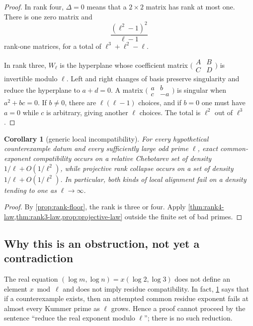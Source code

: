 \documentclass[11pt,oneside]{article}
\newtheorem{corollary}[theorem]{Corollary}
\theoremstyle{definition}
\theoremstyle{remark}
\newcommand{\C}{\mathbb{C}}
\begin{document}
\begin{proof}
In rank four, $\Delta=0$ means that a $2\times2$ matrix has rank at most one.
There is one zero matrix and
\[
 \frac{(\ell^2-1)^2}{\ell-1}
\]
rank-one matrices, for a total of $\ell^3+\ell^2-\ell$.

In rank three, $W_\ell$ is the hyperplane whose coefficient matrix
$\bigl(\begin{smallmatrix}A&B\\C&D\end{smallmatrix}\bigr)$ is invertible
modulo $\ell$.  Left and right changes of basis preserve singularity and
reduce the hyperplane to $a+d=0$.  A matrix
$\bigl(\begin{smallmatrix}a&b\\c&-a\end{smallmatrix}\bigr)$ is singular when
$a^2+bc=0$.  If $b\ne0$, there are $\ell(\ell-1)$ choices, and if $b=0$ one
must have $a=0$ while $c$ is arbitrary, giving another $\ell$ choices.  The
total is $\ell^2$ out of $\ell^3$.
\end{proof}

\begin{corollary}[generic local incompatibility]\label{cor:generic-incompatibility}
For every hypothetical counterexample datum and every sufficiently large odd
prime $\ell$, exact common-exponent compatibility occurs on a relative
Chebotarev set of density $1/\ell+O(1/\ell^2)$, while projective rank collapse
occurs on a set of density $1/\ell+O(1/\ell^2)$.  In particular, both kinds
of local alignment fail on a density tending to one as $\ell\to\infty$.
\end{corollary}

\begin{proof}
By \cref{prop:rank-floor}, the rank is three or four.  Apply
\cref{thm:rank4-law,thm:rank3-law,prop:projective-law} outside the finite set
of bad primes.
\end{proof}

\subsection{Why this is an obstruction, not yet a contradiction}

The real equation $(\log m,\log n)=x(\log2,\log3)$ does not define an element
$x\bmod\ell$ and does not imply residue compatibility.  In fact,
\cref{cor:generic-incompatibility} says that if a counterexample exists, then
an attempted common residue exponent fails at almost every Kummer prime as
$\ell$ grows.  Hence a proof cannot proceed by the sentence
``reduce the real exponent modulo $\ell$''; there is no such reduction.
\end{document}
